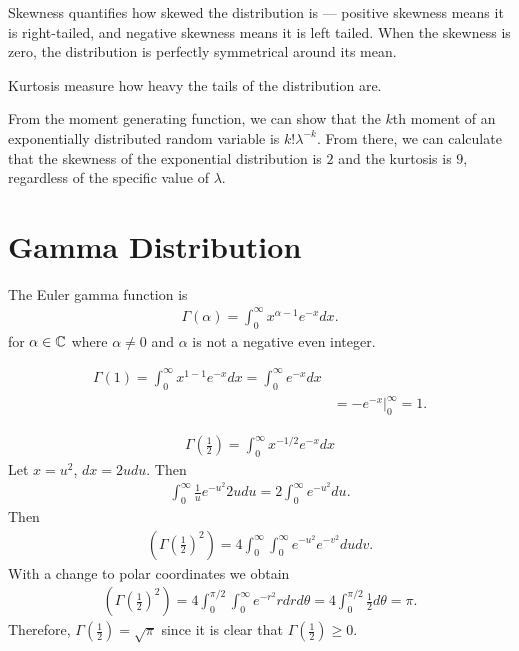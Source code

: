 \begin{rmk}
    Skewness quantifies how skewed the distribution is --- positive skewness means it is right-tailed, and negative skewness means it is left tailed. When the skewness is zero, the distribution is perfectly symmetrical around its mean.

    Kurtosis measure how heavy the tails of the distribution are.
\end{rmk}

\begin{rmk}
    From the moment generating function, we can show that the $k$th moment of an exponentially distributed random variable is $k!\lambda^{-k}$. From there, we can calculate that the skewness of the exponential distribution is $2$ and the kurtosis is $9$, regardless of the specific value of $\lambda$.
\end{rmk}

\section{Gamma Distribution}

\begin{defn}
    The Euler gamma function is
    \begin{align*}
        \Gamma(\alpha) = \int_{0}^{\infty}x^{\alpha-1}e^{-x}dx.
    \end{align*}
    for $\alpha \in \mathbb{C}$ where $\alpha \neq 0$ and $\alpha$ is not a negative even integer.
\end{defn}

\begin{exmp}
    \begin{align*}
        \Gamma(1) = \int_{0}^{\infty}x^{1 - 1}e^{-x}dx = \int_{0}^{\infty}e^{-x}dx \\
        &= -e^{-x}\big\rvert_{0}^{\infty} = 1.
    \end{align*}
\end{exmp}

\begin{exmp}
    \begin{align*}
        \Gamma\left(\frac{1}{2}\right) = \int_{0}^{\infty}x^{-1/2}e^{-x}dx
    \end{align*}
    Let $x = u^2$, $dx = 2udu$. Then
    \begin{align*}
        \int_{0}^{\infty}\frac{1}{u}e^{-u^2}2udu = 2\int_{0}^{\infty}e^{-u^2}du.
    \end{align*}
    Then
    \begin{align*}
        \left(\Gamma\left(\frac{1}{2}\right)^2\right) = 4\int_{0}^{\infty}\int_{0}^{\infty}e^{-u^2}e^{-v^2}dudv.
    \end{align*}
    With a change to polar coordinates we obtain
    \begin{align*}
        \left(\Gamma\left(\frac{1}{2}\right)^2\right) = 4\int_{0}^{\pi/2}\int_{0}^{\infty}e^{-r^2}rdrd\theta = 4\int_{0}^{\pi/2}\frac{1}{2}d\theta = \pi.
    \end{align*}
    Therefore, $\Gamma(\frac{1}{2}) = \sqrt{\pi}$ since it is clear that $\Gamma(\frac{1}{2}) \geq 0$.
\end{exmp}

